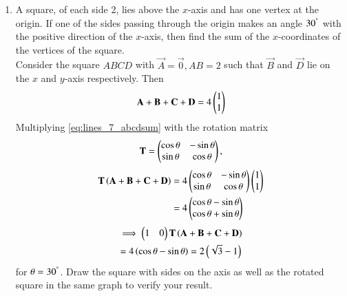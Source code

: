 \begin{enumerate}[label=\arabic*.,ref=\thesubsection.\theenumi]
\item A square, of each side 2, lies above the $x$-axis and has one vertex at the origin.  If one of the sides 
passing through the origin makes an angle $30^{\degree}$ with the positive direction of the $x$-axis, then 
find the 
sum of the $x$-coordinates of the vertices of the square.
\\
\solution Consider the square $ABCD$ with $\vec{A} = \vec{0}, AB = 2$ such that $\vec{B}$ and $\vec{D}$ lie on the $x$ and $y$-axis respectively. Then 
\begin{align}
\mathbf{A}+\mathbf{B}+\mathbf{C}+\mathbf{D} = 4\begin{pmatrix}1 \\ 1\end{pmatrix}
\label{eq:lines_7_abcdsum}
\end{align}
%
Multiplying \eqref{eq:lines_7_abcdsum} with the rotation matrix 
\begin{align}
\label{eq:lines_7_t}
\mathbf{T} = \begin{pmatrix}\cos \theta & -\sin \theta \\ \sin \theta & \cos \theta\end{pmatrix},
\end{align}
\begin{align}
\mathbf{T}\left(\mathbf{A}+\mathbf{B}+\mathbf{C}+\mathbf{D}\right) &= 4\begin{pmatrix}\cos \theta & -\sin \theta \\ \sin \theta & \cos \theta\end{pmatrix}\begin{pmatrix}1 \\ 1\end{pmatrix}
\nonumber \\
&= 4\begin{pmatrix}\cos \theta  -\sin \theta \\ \cos \theta + \sin \theta\end{pmatrix}
\end{align}
\begin{multline}
\implies \begin{pmatrix}1 & 0\end{pmatrix}\mathbf{T}\left(\mathbf{A}+\mathbf{B}+\mathbf{C}+\mathbf{D}\right) 
\\
= 4\left(\cos \theta  -\sin \theta\right)
= 2\left(\sqrt{3}-1\right)
\end{multline}
%
for $\theta = 30^{\degree}$. Draw the square with sides on the axis as well as the rotated square in the same graph to verify your result.



\end{enumerate}
